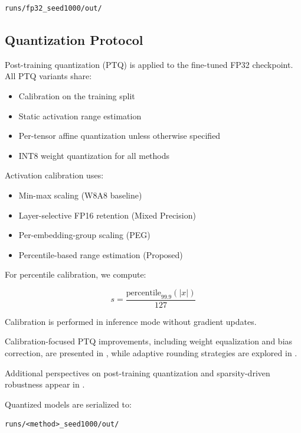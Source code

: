 \documentclass[conference]{IEEEtran}
\begin{document}
\begin{verbatim}
runs/fp32_seed1000/out/
\end{verbatim}

\subsection{Quantization Protocol}

Post-training quantization (PTQ) is applied to the fine-tuned FP32 checkpoint. All PTQ variants share:

\begin{itemize}
\item Calibration on the training split
\item Static activation range estimation
\item Per-tensor affine quantization unless otherwise specified
\item INT8 weight quantization for all methods
\end{itemize}

Activation calibration uses:

\begin{itemize}
\item Min-max scaling (W8A8 baseline)
\item Layer-selective FP16 retention (Mixed Precision)
\item Per-embedding-group scaling (PEG)
\item Percentile-based range estimation (Proposed)
\end{itemize}

For percentile calibration, we compute:

\begin{equation}
s = \frac{\mathrm{percentile}_{99.9}(|x|)}{127}
\end{equation}

Calibration is performed in inference mode without gradient updates.

Calibration-focused PTQ improvements, including weight equalization and bias correction, are presented in \cite{nagel2020data}, while adaptive rounding strategies are explored in \cite{nagel2019up}.

Additional perspectives on post-training quantization and sparsity-driven robustness appear in \cite{bhandare2020bit}.

Quantized models are serialized to:

\begin{verbatim}
runs/<method>_seed1000/out/
\end{verbatim}
\end{document}
